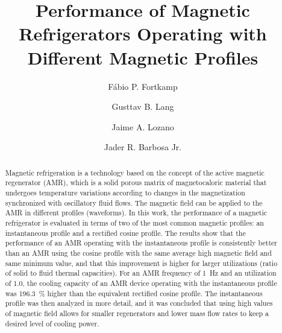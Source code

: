 \documentclass[draft]{svjour3}
\begin{document}
\title{Performance of Magnetic Refrigerators Operating with Different Magnetic Profiles}

\author{
Fábio P. Fortkamp \and
Gusttav B. Lang \and
Jaime A. Lozano \and
Jader R. Barbosa Jr.
}




\date{}


\maketitle

\begin{abstract}
 Magnetic refrigeration is a technology based on the concept of the active magnetic regenerator (AMR), which is a solid porous matrix of magnetocaloric material that undergoes temperature variations according to changes in the magnetization synchronized with oscillatory fluid flows. The magnetic field can be applied to the AMR in different profiles (waveforms). In this work, the performance of a magnetic refrigerator is evaluated in terms of two of the most common magnetic profiles: an instantaneous profile and a rectified cosine profile. The results show that the performance of an AMR operating with the instantaneous profile is consistently better than an AMR using the cosine profile with the same average high magnetic field and same minimum value, and that this improvement is higher for larger utilizations (ratio of solid to fluid thermal capacities). For an AMR frequency of \SI{1}{\hertz} and an utilization of 1.0, the cooling capacity of an AMR device operating with the instantaneous profile was \SI{196.3}{\percent} higher than the equivalent rectified cosine profile. The instantaneous profile was then analyzed in more detail, and it was concluded that using high values of magnetic field allows for smaller regenerators and lower mass flow rates to keep a desired level of cooling power.

\end{abstract}
\end{document}
